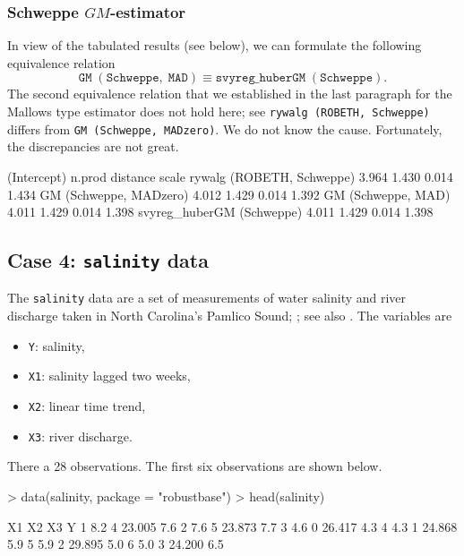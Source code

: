 \documentclass[a4paper]{scrartcl}
\begin{document}
\subsubsection{Schweppe $GM$-estimator}\label{sec:delivery_schweppe}
In view of the tabulated results (see below), we can formulate the following equivalence relation  
\begin{equation*}
   \mathtt{GM \;(Schweppe, \;MAD)} \equiv \mathtt{svyreg\_huberGM \;(Schweppe)}. 
\end{equation*}
\noindent The second equivalence relation that we established in the last paragraph for the Mallows type estimator does not hold here; see \texttt{rywalg (ROBETH, Schweppe)} differs from \texttt{GM (Schweppe, MADzero)}. We do not know the cause. Fortunately, the discrepancies are not great. 

\begin{Schunk}
\begin{Soutput}
                          (Intercept) n.prod distance scale
rywalg (ROBETH, Schweppe)       3.964  1.430    0.014 1.434
GM (Schweppe, MADzero)          4.012  1.429    0.014 1.392
GM (Schweppe, MAD)              4.011  1.429    0.014 1.398
svyreg_huberGM (Schweppe)       4.011  1.429    0.014 1.398
\end{Soutput}
\end{Schunk}


\subsection{Case 4: \texttt{salinity} data}
The \texttt{salinity} data are a set of measurements of water salinity and river discharge taken in North Carolina's Pamlico Sound; \cite{ruppertcarroll}; see also \cite{rousseeuwleroy}. The variables are

\begin{itemize}
   \item \texttt{Y}: salinity, 
   \item \texttt{X1}: salinity lagged two weeks,
   \item \texttt{X2}: linear time trend, 
   \item \texttt{X3}: river discharge.
\end{itemize}

\noindent There a 28 observations. The first six observations are shown below.

\begin{Schunk}
\begin{Sinput}
> data(salinity, package = "robustbase")
> head(salinity)
\end{Sinput}
\begin{Soutput}
   X1 X2     X3   Y
1 8.2  4 23.005 7.6
2 7.6  5 23.873 7.7
3 4.6  0 26.417 4.3
4 4.3  1 24.868 5.9
5 5.9  2 29.895 5.0
6 5.0  3 24.200 6.5
\end{Soutput}
\end{Schunk}
\end{document}
